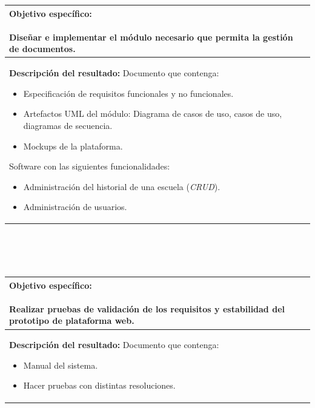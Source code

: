 \documentclass[12pt]{article}
\begin{document}
			 			\begin{tabular}{ |p{15cm}|} \hline
				 \parbox[c]{15cm}{ {\bf Objetivo específico:}\\ \\ Diseñar e implementar el módulo necesario que permita la gestión de documentos.\\} 
			\\
			 \hline
				 \parbox[c]{15cm}{ {\bf Descripción del resultado:}\\ 
				Documento que contenga: \\
				 \begin{itemize}
					 \item 	Especificación de requisitos funcionales y no funcionales.
				  \item Artefactos UML del módulo: Diagrama de casos de uso, casos de uso, diagramas de secuencia.
				  \item Mockups de la plataforma.
				
				 \end{itemize}
			Software con las siguientes funcionalidades:\\
			      \begin{itemize}
				\item Administración del historial de una escuela (\textit{CRUD}).
			       \item Administración de usuarios.
			       \
			     
			      \end{itemize}

				 
					} 
			 \\ \hline			 
			 \end{tabular}	
			 \\ \\  \\ 
			 
			\begin{tabular}{ |p{15cm}|} \hline
				 \parbox[c]{15cm}{ {\bf Objetivo específico:}\\ \\  Realizar pruebas de validación de los requisitos y estabilidad del prototipo de
plataforma web.\\} 
			\\
			 \hline
				 \parbox[c]{15cm}{ {\bf Descripción del resultado:}\\ 
				Documento que contenga: \\
				 \begin{itemize}
				  \item Manual del sistema.
				  \item Hacer pruebas con distintas resoluciones.
				
				 \end{itemize}
		

				 
					} 
			 \\ \hline			 
			 \end{tabular}	
			 \\ \\  \\ 
			 
\end{document}
